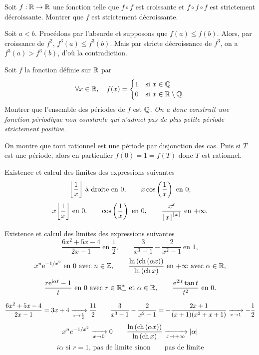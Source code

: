 \documentclass{magnolia}
\begin{document}

Soit $f:\mathbb{R}\to\mathbb{R}$ une fonction telle que $f\circ f$ est croissante et
$f\circ f\circ f$ est strictement décroissante. Montrer que $f$ est
strictement décroissante.

\begin{sol}
Soit $a<b$. Procédons par l'absurde et supposons que $f(a)\leq f(b)$. Alors, par croissance de $f^2$, $f^3(a)\leq f^3(b)$. Mais par stricte décroissance de $f^3$, on a $f^3(a)> f^3(b)$, d'où la contradiction.
\end{sol}



Soit $f$ la fonction définie sur $\mathbb{R}$ par
\[\forall x\in\mathbb{R} ,\quad
  f(x)=
  \begin{cases}
  1 & \text{si $x\in\mathbb{Q}$}\\
  0 & \text{si $x\in\mathbb{R}\setminus\mathbb{Q}$.}  
  \end{cases}\]
Montrer que l'ensemble des périodes de $f$ est $\mathbb{Q}$.
\textit{On a donc construit une fonction périodique non constante qui n'admet pas
de plus petite période strictement positive.}

\begin{sol}
On montre que tout rationnel est une période par disjonction des cas. Puis si $T$ est une période, alors en particulier $f(0)=1=f(T)$ donc $T$ est rationnel.
\end{sol}






Existence et calcul des limites des expressions suivantes
\[\ent{\frac{1}{x}} \ \text{à droite en 0}, \qquad x\cos\p{\frac{1}{x}} \ \text{en 0},\]
\[x\ent{\frac{1}{x}} \ \text{en 0}, \qquad
  \cos\p{\frac{1}{x}} \ \text{en 0}, \qquad
  \frac{x^x}{\ent{x}^{\ent{x}}} \ \text{en $+\infty$}.\]

Existence et calcul des limites des expressions suivantes
\[\frac{6x^2+5x-4}{2x-1} \ \text{en $\frac{1}{2}$}, \qquad
  \frac{3}{x^3-1}-\frac{2}{x^2-1} \ \text{en 1},\]
\[x^n {\rm e}^{-1/x^2} \ \text{en 0 avec $n\in\mathbb{Z}$}, \qquad
  \frac{\ln\left(\operatorname{ch}\left(\alpha x\right)\right)}{\ln\left(\operatorname{ch} x\right)} \ \text{en $+\infty$ avec
  $\alpha\in\mathbb{R}$},\]
\[\frac{r {\rm e}^{{\rm i}\alpha t}-1}{t} \ \text{en 0 avec $r\in\mathbb{R}_+^*$ et $\alpha\in\mathbb{R}$},
  \qquad \frac{{\rm e}^{2{\rm i} t}\tan t}{t^2} \ \text{en 0}.\]
\begin{sol}
\[\frac{6x^2+5x-4}{2x-1}=3x+4\xrightarrow[x\rightarrow \frac{1}{2}]{}\frac{11}{2} \qquad
  \frac{3}{x^3-1}-\frac{2}{x^2-1}=-\frac{2x+1}{(x+1)(x^2+x+1)}\xrightarrow[x\rightarrow 1]{}-\frac{1}{2}\]
\[x^n e^{-1/x^2}\xrightarrow[x\rightarrow 0]{}0 \qquad
  \frac{\ln\left(\operatorname{ch}\left(\alpha x\right)\right)}{\ln\left(\operatorname{ch} x\right)}\xrightarrow[x\rightarrow +\infty]{}\left|\alpha\right|\]
\[i\alpha \text{ si $r=1$, pas de limite sinon} \qquad \text{pas de limite}\]
\end{sol}
\end{document}
